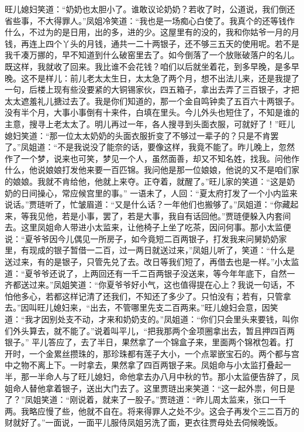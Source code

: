 \documentclass[12pt,oneside]{book}
\begin{document}
旺儿媳妇笑道：“奶奶也太胆小了。谁敢议论奶奶？若收了时，公道说，我们倒还省些事，不大得罪人。”凤姐冷笑道：“我也是一场痴心白使了。我真个的还等钱作什么，不过为的是日用，出的多，进的少。这屋里有的没的，我和你姑爷一月的月钱，再连上四个丫头的月钱，通共一二十两银子，还不够三五天的使用呢。若不是我千凑万挪的，早不知道到什么破窑里去了。如今倒落了一个放账破落户的名儿。既这样，我就收了回来。我比谁不会花钱？咱们以后就坐着花，到多早晚，是多早晚。这不是样儿：前儿老太太生日，太太急了两个月，想不出法儿来，还是我提了一句，后楼上现有些没要紧的大铜锡家伙，四五箱子，拿出去弄了三百银子，才把太太遮羞礼儿搪过去了。我是你们知道的，那一个金自鸣钟卖了五百六十两银子。没有半个月，大事小事倒有十来件，白填在里头。今儿外头也短住了，不知是谁的主意，搜寻上老太太了。明儿再过一年，各人搜寻到头面衣服，可就好了！”旺儿媳妇笑道：“那一位太太奶奶的头面衣服折变了不够过一辈子的？只是不肯罢了。”凤姐道：“不是我说没了能奈的话，要像这样，我竟不能了。昨儿晚上，忽然作了一个梦，说来也可笑，梦见一个人，虽然面善，却又不知名姓，找我。问他作什么，他说娘娘打发他来要一百匹锦。我问他是那一位娘娘，他说的又不是咱们家的娘娘。我就不肯给他，他就上来夺。正夺着，就醒了。”旺儿家的笑道：“这是奶奶的日间操心，常应候宫里的事。”
一语未了，人回：“夏太府打发了一个小内监来说话。”贾琏听了，忙皱眉道：“又是什么话？一年他们也搬够了。”凤姐道：“你藏起来，等我见他，若是小事，罢了，若是大事，我自有话回他。”贾琏便躲入内套间去。这里凤姐命人带进小太监来，让他椅子上坐了吃茶，因问何事。那小太监便说：“夏爷爷因今儿偶见一所房子，如今竟短二百两银子，打发我来问舅奶奶家里，有现成的银子暂借一二百，过一两日就送过来，”凤姐儿听了，笑道：“什么是送过来，有的是银子，只管先兑了去。改日等我们短了，再借去也是一样。”小太监道：“夏爷爷还说了，上两回还有一千二百两银子没送来，等今年年底下，自然一齐都送过来。”凤姐笑道：“你夏爷爷好小气，这也值得提在心上？我说一句话，不怕他多心，若都这样记清了还我们，不知还了多少了。只怕没有；若有，只管拿去。”因叫旺儿媳妇来，“出去，不管哪里先支二百两来。”旺儿媳妇会意，因笑道：“我才因别处支不动，才来和奶奶支的。”凤姐道：“你们只会里头来要钱，叫你们外头算去，就不能了。”说着叫平儿，“把我那两个金项圈拿出去，暂且押四百两银子。”
平儿答应了，去了半日，果然拿了一个锦盒子来，里面两个锦袱包着。打开时，一个金累丝攒珠的，那珍珠都有莲子大小，一个点翠嵌宝石的。两个都与宫中之物不离上下。一时拿去，果然拿了四百两银子来。凤姐命与小太监打叠起一半，那一半命人与了旺儿媳妇，命他拿去办八月中秋的节。那小太监便告辞了，凤姐命人替他拿着银子，送出大门去了。这里贾琏出来笑道：“这一起外祟，何日是了？”凤姐笑道：“刚说着，就来了一股子。”贾琏道：“昨儿周太监来，张口一千两。我略应慢了些，他就不自在。将来得罪人之处不少。这会子再发个三二百万的财就好了。”一面说，一面平儿服侍凤姐另洗了面，更衣往贾母处去伺候晚饭。
\end{document}
